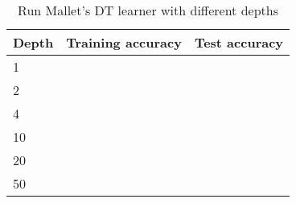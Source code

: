 \documentclass[11pt]{article}
\begin{document}
\begin{table}[h]
\centering
\caption{Run Mallet's DT learner with different depths}
\label{table1}
\begin{tabular}{|l|l|l|} \hline
Depth   & Training accuracy & Test accuracy \\ \hline
1       &    &  \\ \hline
2       &    &  \\ \hline
4       &    &  \\ \hline
10      &    &  \\ \hline
20      &    &  \\ \hline
50      &    &  \\ \hline
\end{tabular}

\end{table}




\vspace{0.7 in}
\end{document}
